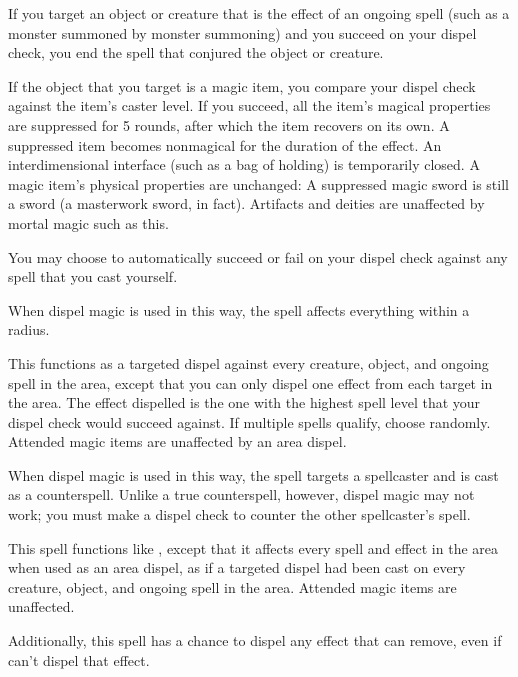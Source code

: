 \begin{spelleffect}
    \par If you target an object or creature that is the effect of an ongoing spell (such as a monster summoned by monster summoning) and you succeed on your dispel check, you end the spell that conjured the object or creature.
    \par If the object that you target is a magic item, you compare your dispel check against the item's caster level. If you succeed, all the item's magical properties are suppressed for 5 rounds, after which the item recovers on its own. A suppressed item becomes nonmagical for the duration of the effect. An interdimensional interface (such as a bag of holding) is temporarily closed. A magic item's physical properties are unchanged: A suppressed magic sword is still a sword (a masterwork sword, in fact). Artifacts and deities are unaffected by mortal magic such as this.
    \par You may choose to automatically succeed or fail on your dispel check against any spell that you cast yourself.
    \par {} When dispel magic is used in this way, the spell affects everything within a \areamed radius.

    \par This functions as a targeted dispel against every creature, object, and ongoing spell in the area, except that you can only dispel one effect from each target in the area. The effect dispelled is the one with the highest spell level that your dispel check would succeed against. If multiple spells qualify, choose randomly. Attended magic items are unaffected by an area dispel.

    \par {} When dispel magic is used in this way, the spell targets a spellcaster and is cast as a counterspell. Unlike a true counterspell, however, dispel magic may not work; you must make a dispel check to counter the other spellcaster's spell.
\end{spelleffect}

\begin{spelleffect}
    This spell functions like , except that it affects every spell and effect in the area when used as an area dispel, as if a targeted dispel had been cast on every creature, object, and ongoing spell in the area. Attended magic items are unaffected.
    \par Additionally, this spell has a chance to dispel any effect that  can remove, even if  can't dispel that effect.
\end{spelleffect}

